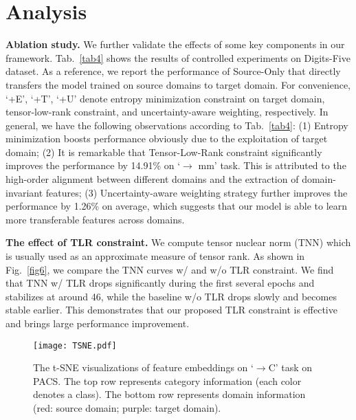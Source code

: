 \documentclass[10pt,twocolumn,letterpaper]{article}
\begin{document}
\section{Analysis}
\textbf{Ablation study.} We further validate the effects of some key components in our framework. Tab.~\ref{tab4} shows the results of controlled experiments on Digits-Five dataset. As a reference, we report the performance of Source-Only that directly transfers the model trained on source domains to target domain. For convenience, `+E', `+T', `+U' denote entropy minimization constraint on target domain, tensor-low-rank constraint, and uncertainty-aware weighting, respectively. In general, we have the following observations according to Tab.~\ref{tab4}: (1) Entropy minimization boosts performance obviously due to the exploitation of target domain; (2) It is remarkable that Tensor-Low-Rank constraint significantly improves the performance by 14.91\% on `$\to$ mm' task. This is attributed to the high-order alignment between different domains and the extraction of domain-invariant features; (3) Uncertainty-aware weighting strategy further improves the performance by 1.26\% on average, which suggests that our model is able to learn more transferable features across domains.\par

\textbf{The effect of TLR constraint.} We compute tensor nuclear norm (TNN) which is usually used as an approximate measure of tensor rank. As shown in Fig.~\ref{fig6}, we compare the TNN curves w/ and w/o TLR constraint. We find that TNN w/ TLR drops significantly during the first several epochs and stabilizes at around 46, while the baseline w/o TLR drops slowly and becomes stable earlier. This demonstrates that our proposed TLR constraint is effective and brings large performance improvement. 
\begin{figure}
	\centering
	\texttt{[image: TSNE.pdf]}\\
	\caption{The t-SNE visualizations of feature embeddings on `$\to$C' task on PACS. The top row represents category information (each color denotes a class). The bottom row represents domain information (red: source domain; purple: target domain).}
	\label{fig3}
	\vspace{-1em}
\end{figure}
\end{document}
